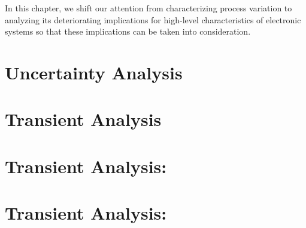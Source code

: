 In this chapter, we shift our attention from characterizing process variation to
analyzing its deteriorating implications for high-level characteristics of
electronic systems so that these implications can be taken into consideration.

\section{\introductiontitle}

\section{\motivationtitle}

\section{\problemtitle}

\section{\priortitle}

\section{\solutiontitle}

\section{Uncertainty Analysis}

\section{Transient Analysis}

\section{Transient Analysis: \applicationtitle}

\section{Transient Analysis: \resultstitle}


